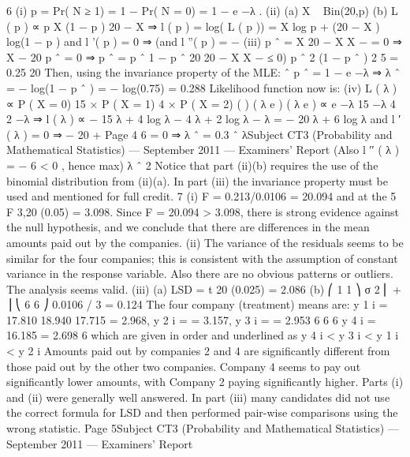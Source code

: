 6
(i) p = Pr( N ≥ 1) = 1 − Pr( N = 0) = 1 − e −λ .
(ii) (a)
X ~ Bin(20,p)
(b)
L ( p ) ∝ p X (1 − p ) 20 − X
⇒ l ( p ) = log( L ( p )) = X log p + (20 − X ) log(1 − p )
and l '( p ) = 0 ⇒
(and l ''( p ) = −
(iii)
p ˆ =
X 20 − X
X
−
= 0 ⇒ X − 20 p ˆ = 0 ⇒ p ˆ =
p ˆ
1 − p ˆ
20
20 − X
X
−
≤ 0)
p ˆ 2 (1 − p ˆ ) 2
5
= 0.25
20
Then, using the invariance property of the MLE:
ˆ
p ˆ = 1 − e −λ ⇒ λ ˆ = − log(1 − p ˆ ) = − log(0.75) = 0.288
Likelihood function now is:
(iv)
L ( λ ) ∝ P ( X = 0) 15 × P ( X = 1) 4 × P ( X = 2)
( ) ( λ e ) ( λ e )
∝ e −λ
15
−λ
4
2 −λ
⇒ l ( λ ) ∝ − 15 λ + 4 log λ − 4 λ + 2 log λ − λ = − 20 λ + 6 log λ
and l ′ ( λ ) = 0 ⇒ − 20 +
Page 4
6
= 0 ⇒ λ ˆ = 0.3
ˆ λSubject CT3 (Probability and Mathematical Statistics) — September 2011 — Examiners’ Report
(Also l ′′ ( λ ) = −
6
< 0 , hence max)
λ ˆ 2
Notice that part (ii)(b) requires the use of the binomial distribution from (ii)(a). In part (iii)
the invariance property must be used and mentioned for full credit.
7
(i) F = 0.213/0.0106 = 20.094 and at the 5%
F 3,20 (0.05) = 3.098.
Since F = 20.094 > 3.098, there is strong evidence against the null hypothesis,
and we conclude that there are differences in the mean amounts paid out by
the companies.
(ii) The variance of the residuals seems to be similar for the four companies; this
is consistent with the assumption of constant variance in the response variable.
Also there are no obvious patterns or outliers. The analysis seems valid.
(iii) (a)
LSD = t 20 (0.025)
= 2.086
(b)
⎛ 1 1 ⎞
σ 2 ⎜ + ⎟
⎝ 6 6 ⎠
0.0106 / 3 = 0.124
The four company (treatment) means are:
y 1 i = 17.810
18.940
17.715
= 2.968, y 2 i =
= 3.157, y 3 i =
= 2.953
6
6
6
y 4 i = 16.185
= 2.698
6
which are given in order and underlined as
y 4 i < y 3 i < y 1 i < y 2 i
Amounts paid out by companies 2 and 4 are significantly different
from those paid out by the other two companies. Company 4 seems to
pay out significantly lower amounts, with Company 2 paying
significantly higher.
Parts (i) and (ii) were generally well answered. In part (iii) many candidates did not use the
correct formula for LSD and then performed pair-wise comparisons using the wrong statistic.
Page 5Subject CT3 (Probability and Mathematical Statistics) — September 2011 — Examiners’ Report
